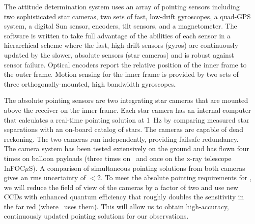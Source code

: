 The attitude determination system uses an array of pointing sensors
including two sophisticated star cameras, two sets of fast, low-drift
gyroscopes, a quad-GPS system, a digital Sun sensor, encoders, tilt
sensors, and a magnetometer.  The software is written to take full
advantage of the abilities of each sensor in a hierarchical scheme
where the fast, high-drift sensors (gyros) are continuously updated by
the slower, absolute sensors (star cameras) and is robust against
sensor failure.
Optical encoders report the relative position of the inner frame to
the outer frame.  Motion sensing for the inner frame is provided by
two sets of three orthogonally-mounted, high bandwidth gyroscopes.

The absolute pointing sensors are two integrating star cameras
 that are mounted above the receiver on the inner frame.
Each star camera has an internal computer that calculates a real-time
pointing solution at 1~Hz by comparing measured star separations with
an on-board catalog of stars.  The cameras are capable of dead
reckoning.  The two cameras run independently, providing failsafe
redundancy.
The camera system has been tested extensively on the ground and has
flown four times on balloon payloads (three times on \blast\ and once
on the x-ray telescope InFOC$\mu$S).  
A comparison of simultaneous pointing solutions from both cameras
gives an rms uncertainty of $<$2\arcsec.  To meet the absolute
pointing requirements for \name, we will reduce the field of view of
the cameras by a factor of two and use new CCDs with enhanced quantum
efficiency that roughly doubles the sensitivity in the far red (where
\name\ uses them).  This will allow us to obtain high-accuracy,
continuously updated pointing solutions for our observations.


